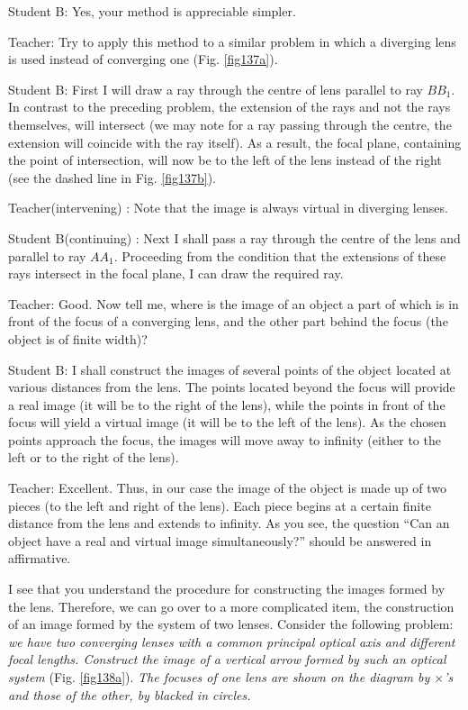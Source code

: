 \documentclass[a4paper,12pt]{book}
\begin{document}
{{\sc Student B:} Yes, your method is appreciable simpler. 

 {\sc Teacher:} Try to apply this method to a similar problem in which a diverging lens is used instead of converging one (Fig. \ref{fig137a}).

{\sc Student B:} First I will draw a ray through the centre of lens parallel to ray $BB_{1}$. In contrast to the preceding problem, the extension of the rays and not the rays themselves, will intersect (we may note for a ray passing through the centre, the extension will coincide with the ray itself). As a result, the focal plane, containing the point of intersection, will now be to the left of the lens instead of the right (see the dashed line in Fig. \ref{fig137b}).

{\sc Teacher}(intervening) : Note that the image is always virtual in diverging lenses.

{\sc Student B}(continuing) : Next I shall pass a ray through the centre of the lens and parallel to ray $AA_{1}$. Proceeding from the condition that the extensions of these rays intersect in the focal plane, I can draw the required ray.  

 {\sc Teacher:} Good. Now tell me, where is the image of an object a part of which is in front of the focus of a converging lens, and the other part behind the focus (the object is of finite width)?

{\sc Student B:} I shall construct the images of several points of the object located at various distances from the lens. The points located beyond the focus will provide a real image (it will be to the right of the lens), while the points in front of the focus will yield a virtual image (it will be to the left of the lens). As the chosen points approach the focus, the images will move away to infinity (either to the left or to the right of the lens).

{\sc Teacher:} Excellent. Thus, in our case the image of the object is made up of two pieces (to the left and right of the lens). Each piece begins at a certain finite distance from the lens and extends to infinity. As you see, the question ``Can an object have a real and virtual image simultaneously?'' should be answered in affirmative. 

I see that you understand the procedure for constructing the images formed by the lens. Therefore, we can go over to a more complicated item, the construction of an image formed by the system of two lenses. Consider the following problem: \emph{we have two converging lenses with a common principal optical axis and different focal lengths. Construct the image of a vertical arrow formed by such an optical system }(Fig. \ref{fig138a}). \emph{The focuses of one lens are shown on the diagram by $\times$'s and those of the other,  by blacked in circles.}

}
\end{document}

